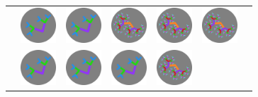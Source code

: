 \documentclass[
  letterpaper,
  DIV=11,
  numbers=noendperiod,
  oneside]{scrreprt}
\begin{document}
\begin{longtable}[]{@{}lllllll@{}}
&
\includegraphics[width=\linewidth,height=0.52083in,keepaspectratio]{images/fractal-low.png}
&
\includegraphics[width=\linewidth,height=0.52083in,keepaspectratio]{images/fractal-low.png}
&
\includegraphics[width=\linewidth,height=0.52083in,keepaspectratio]{images/fractal-high.png}
&
\includegraphics[width=\linewidth,height=0.52083in,keepaspectratio]{images/fractal-high.png}
&
\includegraphics[width=\linewidth,height=0.52083in,keepaspectratio]{images/fractal-high.png} \\
&
\includegraphics[width=\linewidth,height=0.52083in,keepaspectratio]{images/fractal-low.png}
&
\includegraphics[width=\linewidth,height=0.52083in,keepaspectratio]{images/fractal-low.png}
&
\includegraphics[width=\linewidth,height=0.52083in,keepaspectratio]{images/fractal-low.png}
&
\includegraphics[width=\linewidth,height=0.52083in,keepaspectratio]{images/fractal-high.png}

\end{longtable}
\end{document}
